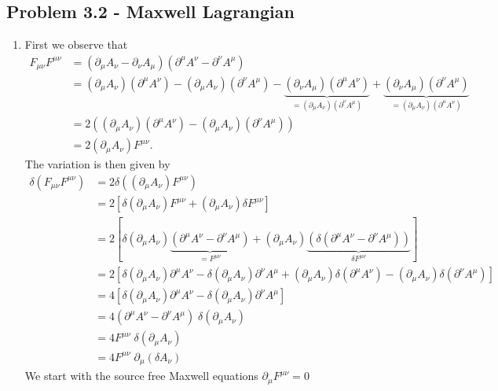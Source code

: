 \documentclass[10pt,a4paper]{book}
\theoremstyle{definition}
\begin{document}
\subsection{Problem 3.2 - Maxwell Lagrangian}
\begin{enumerate}
    \item First we observe that
    \begin{align}
        F_{\mu\nu}F^{\mu\nu}
        &=(\partial_\mu A_\nu-\partial_\nu A_\mu)(\partial^\mu A^\nu-\partial^\nu A^\mu)\\
        &=(\partial_\mu A_\nu)(\partial^\mu A^\nu)-(\partial_\mu A_\nu)(\partial^\nu A^\mu)-\underbrace{(\partial_\nu A_\mu)(\partial^\mu A^\nu)}_{=(\partial_\mu A_\nu)(\partial^\nu A^\mu)}+\underbrace{(\partial_\nu A_\mu)(\partial^\nu A^\mu)}_{=(\partial_\mu A_\nu)(\partial^\mu A^\nu)}\\
        &=2\left((\partial_\mu A_\nu)(\partial^\mu A^\nu)-(\partial_\mu A_\nu)(\partial^\nu A^\mu)\right)\\
        &=2(\partial_\mu A_\nu)F^{\mu\nu}.
    \end{align}
    The variation is then given by
    \begin{align}
        \delta\left(F_{\mu\nu}F^{\mu\nu}\right)
        &=2\delta\left((\partial_\mu A_\nu)F^{\mu\nu}\right)\\
        &=2\left[\delta\left(\partial_\mu A_\nu\right)F^{\mu\nu}+(\partial_\mu A_\nu)\delta F^{\mu\nu}\right]\\
        &=2[\delta\left(\partial_\mu A_\nu\right)\underbrace{(\partial^\mu A^\nu-\partial^\nu A^\mu)}_{=F^{\mu\nu}}+(\partial_\mu A_\nu)\underbrace{\left(\delta(\partial^\mu A^\nu-\partial^\nu A^\mu)\right)}_{\delta F^{\mu\nu}}]\\
        &=2\left[\delta\left(\partial_\mu A_\nu\right)\partial^\mu A^\nu-\delta\left(\partial_\mu A_\nu\right)\partial^\nu A^\mu+(\partial_\mu A_\nu)\delta(\partial^\mu A^\nu)-(\partial_\mu A_\nu)\delta(\partial^\nu A^\mu) \right]\\
        &=4\left[\delta\left(\partial_\mu A_\nu\right)\partial^\mu A^\nu-\delta\left(\partial_\mu A_\nu\right)\partial^\nu A^\mu \right]\\
        &=4(\partial^\mu A^\nu-\partial^\nu A^\mu)\;\delta(\partial_\mu A_\nu)\\
        &=4F^{\mu\nu}\;\delta(\partial_\mu A_\nu)\\
        &=4F^{\mu\nu}\;\partial_\mu(\delta A_\nu)
    \end{align}
    We start with the source free Maxwell equations $\partial_\mu F^{\mu\nu}=0$

\end{enumerate}
\end{document}
